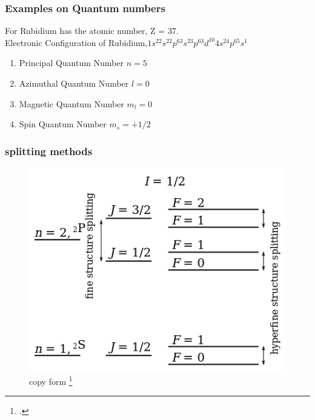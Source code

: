 \documentclass[18 pt]{beamer}
\begin{document}
\begin{frame}
  \frametitle{Examples on Quantum numbers}
  For Rubidium has the atomic number, Z = 37.\\
  Electronic Configuration of Rubidium,\(1s^22s^22p^63s^23p^63d^{10}4s^24p^65s^1\)
  \begin{enumerate}
    \item Principal Quantum Number \(n = 5\)
    \item Azimuthal Quantum Number \(l = 0\)
    \item Magnetic Quantum Number \(m_l = 0\)
    \item Spin Quantum Number \(m_s = +1/2\)
  \end{enumerate}
\end{frame}
\begin{frame}
  \frametitle{splitting methods}
  \begin{figure}
    \includegraphics[width=.6\linewidth]{440px-Fine_hyperfine_levels.svg.png}
    \caption{copy form \footcite{https://en.wikipedia.org/wiki/Hyperfine_structure}}
  \end{figure}
\end{frame}
\end{document}
